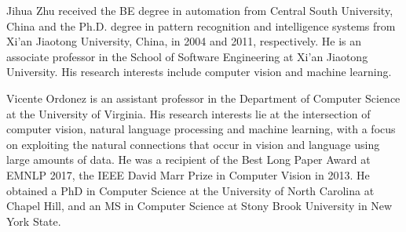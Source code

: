 \documentclass[journal]{IEEEtran}
\begin{document}
\begin{IEEEbiography}{Jihua Zhu}
received the BE degree in automation from Central South University, China and the Ph.D. degree in pattern recognition and intelligence systems from Xi'an Jiaotong University, China, in 2004 and 2011, respectively.
He is an associate professor in the School of Software Engineering at Xi'an Jiaotong University.
His research interests include computer vision and machine learning.
\end{IEEEbiography}

\begin{IEEEbiography}{Vicente Ordonez} is an assistant professor in the Department of Computer Science at the University of Virginia. His research interests lie at the intersection of computer vision, natural language processing and machine learning, with a focus on exploiting the natural connections that occur in vision and language using large amounts of data. He was a recipient of the Best Long Paper Award at EMNLP 2017, the IEEE David Marr Prize in Computer Vision in 2013. He obtained a PhD in Computer Science at the University of North Carolina at Chapel Hill, and an MS in Computer Science at Stony Brook University in New York State.
\end{IEEEbiography}
\end{document}
